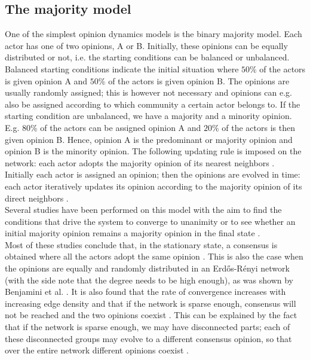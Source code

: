 \documentclass[11 pt , letterpaper , twoside , openright]{book}
\begin{document}
\subsection{The majority model}\label{majModel}

One of the simplest opinion dynamics models is the binary majority model. Each actor has one of two opinions, A or B. Initially, these opinions can be equally distributed or not, i.e. the starting conditions can be balanced or unbalanced. Balanced starting conditions indicate the initial situation where $50 \%$ of the actors is given opinion A and $50 \%$ of the actors is given opinion B. The opinions are usually randomly assigned; this is however not necessary and opinions can e.g. also be assigned according to which community a certain actor belongs to. If the starting condition are unbalanced, we have a majority and a minority opinion. E.g. $80 \%$ of the actors can be assigned opinion A and $20 \%$ of the actors is then given opinion B. Hence, opinion A is the predominant or majority opinion and opinion B is the minority opinion. The following updating rule is imposed on the network: each actor adopts the majority opinion of its nearest neighbors \cite{Nguyen2020}. Initially each actor is assigned an opinion; then the opinions are evolved in time: each actor iteratively updates its opinion according to the majority opinion of its direct neighbors \cite{Nguyen2020}.\\
\newline
Several studies have been performed on this model with the aim to find the conditions that drive the system to converge to unanimity or to see whether an initial majority opinion remains a majority opinion in the final state \cite{Nguyen2020}.\\
\newline
Most of these studies conclude that, in the stationary state, a consensus is obtained where all the actors adopt the same opinion \cite{Nguyen2020}. This is also the case when the opinions are equally and randomly distributed in an Erd\H{o}s-R\'{e}nyi network (with the side note that the degree needs to be high enough), as was shown by Benjamini et al. \cite{Benjamini2016}. It is also found that the rate of convergence increases with increasing edge density and that if the network is sparse enough, consensus will not be reached and the two opinions coexist \cite{Nguyen2020}. This can be explained by the fact that if the network is sparse enough, we may have disconnected parts; each of these disconnected groups may evolve to a different consensus opinion, so that over the entire network different opinions coexist \cite{Nguyen2020}.
\end{document}
